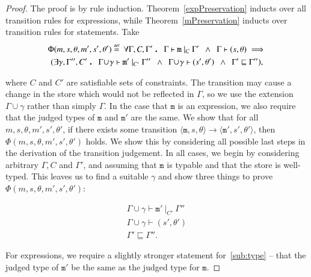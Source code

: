 \documentclass[12pt,a4paper,twoside,openright]{report}
\theoremstyle{definition}
\theoremstyle{dotless}
\newcommand{\transition}[6]{\langle{}\mathtt{#1},#2,#3\rangle{}\rightarrow{}\langle{}\mathtt{#4},#5,#6\rangle}
\newcommand\eqdef{\mathrel{\overset{\makebox[0pt]{\mbox{\normalfont\tiny def}}}{=}}}
\newcommand\qdot{\mathbin{\scalebox{1.5}{.}}\enspace}
\begin{document}
\begin{proof}
  The proof is by rule induction. Theorem~\ref{expPreservation} inducts over all
  transition rules for expressions, while Theorem~\ref{mPreservation} inducts over
  transition rules for statements. Take 
  \begin{multline*}
 	\Phi(m, s, \theta, m', s', \theta') \eqdef 
	\	\forall\Gamma,C,\Gamma' \qdot
	\Gamma\vdash\mathtt{m}\ |_C\ \Gamma' 
	\enspace\land\enspace\Gamma\vdash (s,\theta)
	\implies \\
   	(\exists\gamma,\Gamma'',C'\qdot
    \Gamma\!\cup\!\gamma\vdash \mathtt{m'}\ |_{C'}\ \Gamma'' 
	\enspace\land\enspace\Gamma\!\cup\!\gamma\vdash (s',\theta')
	\enspace\land\enspace \Gamma'\sqsubseteq\Gamma''),
  \end{multline*} 

  where $C$ and $C'$ are satisfiable sets of constraints. The transition may
  cause a change in the store which would not be reflected in $\Gamma$, so we
  use the extension $\Gamma\!\cup\!\gamma$ rather than simply $\Gamma$. In the
  case that $\mathtt{m}$ is an expression, we also require that the judged
  types of $\mathtt{m}$ and $\mathtt{m'}$ are the same. We show that for all
  $m, s, \theta, m', s', \theta'$, if there exists some transition
  $\transition{m}{s}{\theta}{m'}{s'}{\theta'}$, then
  $\Phi(m,s,\theta,m',s',\theta')$ holds. We show this by considering all
  possible last steps in the derivation of the transition judgement. In all
  cases, we begin by considering arbitrary $\Gamma, C$ and $\Gamma'$, and
  assuming that $\mathtt{m}$ is typable and that the store is well-typed. This leaves us to find
  a suitable $\gamma$ and show three things to prove $\Phi(m,s,\theta,m',s',\theta')$:

  \begin{gather}
	\Gamma\!\cup\!\gamma\vdash\mathtt{m'}\ |_{C'}\ \Gamma'' \label{sub:type}\\
	\Gamma\!\cup\!\gamma\vdash(s',\theta') \label{sub:store} \\
	\Gamma' \sqsubseteq \Gamma'' \label{sub:env}.
  \end{gather}

  For expressions, we require a slightly stronger statement for~\eqref{sub:type} -- that
  the judged type of $\mathtt{m'}$ be the same as the judged type for $\mathtt{m}$.


\end{proof}
\end{document}
